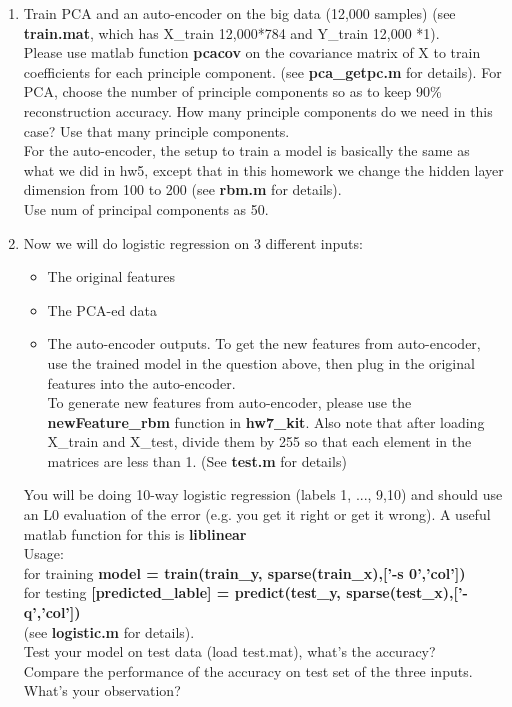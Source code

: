 \begin{enumerate}
\item Train PCA and an auto-encoder on the big data  (12,000 samples) (see {\bf train.mat}, which has X\_train 12,000*784 and Y\_train 12,000 *1). \\
Please use matlab function {\bf pcacov} on the covariance matrix of X to train coefficients for each principle component. (see {\bf pca\_getpc.m} for details).
For PCA, choose the number of principle components so as to keep 90\% reconstruction accuracy. How many principle components do we need in this case? Use that many principle components. \\
For the auto-encoder, the setup to train a model is basically the same as what we did in hw5, except that in this homework we change the hidden layer dimension from 100 to 200 (see {\bf rbm.m} for details). \\ 

Use num of principal components as 50. \\

\item Now we will do logistic regression on 3 different inputs:\\
\begin{itemize}
\item The original features
\item The PCA-ed data
\item The auto-encoder outputs. To get the new features from auto-encoder, use the trained model in the question above, then plug in the original features into the auto-encoder. \\
To generate new features from auto-encoder, please use the \textbf{newFeature\_rbm} function in \textbf{hw7\_kit}.
Also note that after loading X\_train and X\_test, divide them by 255 so that each element in the matrices are less than 1. (See \textbf{test.m} for details)
\end{itemize}
You will be doing 10-way logistic regression (labels 1, ..., 9,10) and should use an L0 evaluation of the error (e.g. you get it right or get it wrong).  A useful matlab function for this is {\bf liblinear}\\
Usage: \\
for training \textbf{model = train(train\_y, sparse(train\_x),['-s 0','col'])}\\
for testing  \textbf{[predicted\_lable] = predict(test\_y, sparse(test\_x),['-q','col'])}\\
(see {\bf logistic.m} for details). \\ 
Test your model on test data (load test.mat), what's the accuracy? \\
Compare the performance of the accuracy on test set of the three inputs. What's your observation? \\


\end{enumerate}
